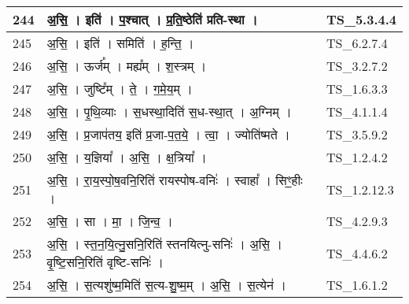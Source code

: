 \documentclass[17pt]{extarticle}
\begin{document}
\begin{longtable}{||p{0.4in}||p{4.9in}||p{0.9in}||}
    \hline
        
    244 & अ॒सि॒   ।   इति॑   ।   प॒श्चात्   ।   प्र॒ति॒ष्ठेति॑ प्रति{-}स्था   ।    & TS\_5.3.4.4       \\
    
    \hline
        
    245 & अ॒सि॒   ।   इति॑   ।   समिति॑   ।   ह॒न्ति॒   ।    & TS\_6.2.7.4       \\
    
    \hline
        
    246 & अ॒सि॒   ।   ऊर्ज᳚म्   ।   मह्य᳚म्   ।   श॒स्त्रम्   ।    & TS\_3.2.7.2       \\
    
    \hline
        
    247 & अ॒सि॒   ।   जुष्टि᳚म्   ।   ते॒   ।   ग॒मे॒य॒म्   ।    & TS\_1.6.3.3       \\
    
    \hline
        
    248 & अ॒सि॒   ।   पृ॒थि॒व्याः   ।   स॒धस्था॒दिति॑ स॒ध{-}स्था॒त्   ।   अ॒ग्निम्   ।    & TS\_4.1.1.4       \\
    
    \hline
        
    249 & अ॒सि॒   ।   प्र॒जाप॑तय॒ इति॑ प्र॒जा{-}प॒त॒ये॒   ।   त्वा॒   ।   ज्योति॑ष्मते   ।    & TS\_3.5.9.2       \\
    
    \hline
        
    250 & अ॒सि॒   ।   य॒ज्ञिया᳚   ।   अ॒सि॒   ।   क्ष॒त्रिया᳚   ।    & TS\_1.2.4.2       \\
    
    \hline
        
    251 & अ॒सि॒   ।   रा॒य॒स्पो॒ष॒वनि॒रिति॑ रायस्पोष{-}वनिः॑   ।   स्वाहा᳚   ।   सिꣳ॒॒हीः   ।    & TS\_1.2.12.3       \\
    
    \hline
        
    252 & अ॒सि॒   ।   सा   ।   मा॒   ।   जि॒न्व॒   ।    & TS\_4.2.9.3       \\
    
    \hline
        
    253 & अ॒सि॒   ।   स्त॒न॒यि॒त्नु॒सनि॒रिति॑ स्तनयित्नु{-}सनिः॑   ।   अ॒सि॒   ।   वृ॒ष्टि॒सनि॒रिति॑ वृष्टि{-}सनिः॑   ।    & TS\_4.4.6.2       \\
    
    \hline
        
    254 & अ॒सि॒   ।   स॒त्यशु॑ष्म॒मिति॑ स॒त्य{-}शु॒ष्म॒म्   ।   अ॒सि॒   ।   स॒त्येन॑   ।    & TS\_1.6.1.2       \\
    

\end{longtable}
\end{document}

